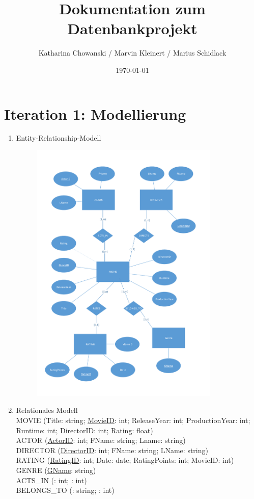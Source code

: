 \documentclass[a4paper,11pt]{article}
\title{Dokumentation zum Datenbankprojekt}
\author{Katharina Chowanski / Marvin Kleinert / Marius Schidlack}
\date{\today}
\begin{document}
\maketitle 

\section*{Iteration 1: Modellierung}
\begin{enumerate}
\item Entity-Relationship-Modell
\begin{figure}[htbp]
	\centering
		\includegraphics[width=0.85\textwidth]{MoviesER_Portrait.pdf}
	\label{fig:MoviesER}
\end{figure}

\item Relationales Modell \\[0.5cm]
MOVIE (Title: string; \uline{MovieID}: int; ReleaseYear: int; ProductionYear: int; Runtime: int; DirectorID: int; Rating: float)\\[0.5cm]
ACTOR (\uline{ActorID}: int; FName: string; Lname: string)\\[0.5cm]
DIRECTOR (\uline{DirectorID}: int; FName: string; LName: string)\\[0.5cm]
RATING (\uline{RatingID}: int; Date: date; RatingPoints: int; MovieID: int)\\[0.5cm]
GENRE (\uline{GName}: string)\\[0.5cm]
ACTS\_IN (\underline{}: int; \underline{}: int)\\[0.5cm]
BELONGS\_TO (\underline{}: string; \underline{}: int)\\[0.5cm]


\end{enumerate}
\end{document}
